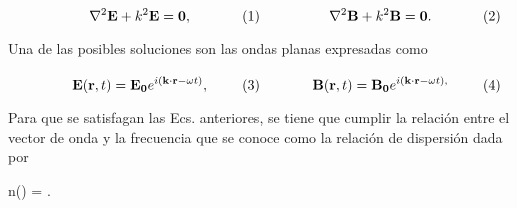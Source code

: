 	\begin{subequations}%
	\eqhalf{\nabla^2\vb{E} + k^2 \vb{E}=\vb{0},}%
	\eqhalf{\nabla^2\vb{B} + k^2 \vb{B}=\vb{0}.}\label{eq:Helmholtz}%
	\end{subequations}\vspace*{-1em}

\noindent Una de las posibles soluciones son las ondas planas expresadas como 

	\begin{subequations}%
	\eqhalf{\vb{E}(\vb{r},t) =\vb{E_0}e^{i(\vb{k}\cdot\vb{r} -\omega t)},}%
	\eqhalf{\vb{B}(\vb{r}, t) =\vb{B_0}e^{i(\vb{k}\cdot\vb{r} -\omega t),}}	
	\label{eqs:ondasPlanas}\end{subequations}\vspace*{-1em}
		
\noindent Para que se satisfagan las Ecs. anteriores, se tiene que cumplir la relación entre el vector de onda y la frecuencia que se conoce como la relación de dispersión dada por


\vspace*{-.75em}
%
	\begin{tcolorbox}[title = Índice de refracción, ams align]
	n(\omega) = .
		\label{eq:indice} 
	\end{tcolorbox}\vspace*{-.75em}

